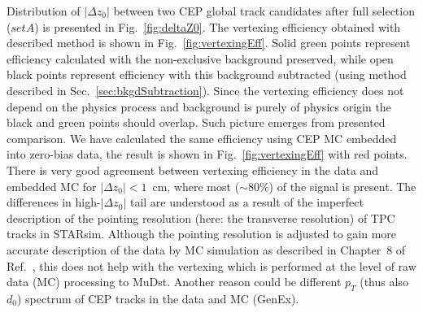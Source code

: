 Distribution of $|\Delta z_{0}|$ between two CEP global track candidates after full selection ($set A$) is presented in Fig.~\ref{fig:deltaZ0}. The vertexing efficiency obtained with described method is shown in Fig.~\ref{fig:vertexingEff}. Solid green points represent efficiency calculated with the non-exclusive background preserved, while open black points represent efficiency with this background subtracted (using method described in Sec.~\ref{sec:bkgdSubtraction}). Since the vertexing efficiency does not depend on the physics process and background is purely of physics origin the black and green points should overlap. Such picture emerges from presented comparison. We have calculated the same efficiency using CEP MC embedded into zero-bias data, the result is shown in Fig.~\ref{fig:vertexingEff} with red points. There is very good agreement between vertexing efficiency in the data and embedded MC for $|\Delta z_{0}|<1$~cm, where most ($\sim80\%$) of the signal is present. The differences in high-$|\Delta z_{0}|$ tail are understood as a result of the imperfect description of the pointing resolution (here: the transverse resolution) of TPC tracks in STARsim. Although the pointing resolution is adjusted to gain more accurate description of the data by MC simulation as described in Chapter~8 of Ref.~\cite{supplementaryNote}, this does not help with the vertexing which is performed at the level of raw data (MC) processing to MuDst. Another reason could be different $p_{T}$ (thus also $d_{0}$) spectrum of CEP tracks in the data and MC (GenEx).

